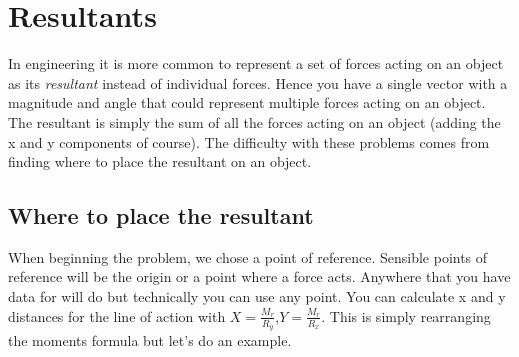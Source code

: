 \documentclass[a4paper, 12pt]{article}
\begin{document}
\section{Resultants}
In engineering it is more common to represent a set of forces acting on an object as its \textit{resultant} instead of individual forces.
Hence you have a single vector with a magnitude and angle that could represent multiple forces acting on an object. 
The resultant is simply the sum of all the forces acting on an object (adding the x and y components of course). 
The difficulty with these problems comes from finding where to place the resultant on an object.
\subsection{Where to place the resultant} When beginning the problem, we chose a point of reference.
Sensible points of reference will be the origin or a point where a force acts.
Anywhere that you have data for will do but technically you can use any point.
You can calculate x and y distances for the line of action with $X=\frac{M_r}{R_y}$,$Y=\frac{M_r}{R_x}$.
This is simply rearranging the moments formula but let's do an example.
\end{document}
